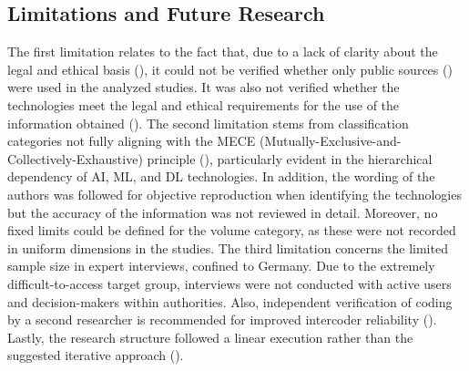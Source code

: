 \documentclass[10pt]{article}
\begin{document}

\subsection{Limitations and Future Research}

The first limitation relates to the fact that, due to a lack of clarity about the legal
and ethical basis (\cite{Ghioni.2023,Wittmer.2022}),
it could not be verified whether only public sources (\cite{NorthAtlanticTreatyOrganization.2002}) were used
in the analyzed studies. It was also not verified whether the technologies meet the
legal and ethical requirements for the use of the information obtained
(\cite{PastorGalindo.2020,Wittmer.2022}). The second
limitation stems from classification categories not fully aligning with the
MECE (Mutually-Exclusive-and-Collectively-Exhaustive) principle (\cite{Lee.2018}),
particularly evident in the hierarchical dependency of AI, ML, and DL technologies. In addition,
the wording of the authors was followed for objective reproduction when identifying the technologies
but the accuracy of the information was not reviewed in detail. Moreover, no fixed limits could be defined
for the volume category, as these were not recorded in uniform dimensions in the studies.
The third limitation concerns the limited sample size in expert interviews, confined to Germany. Due to the
extremely difficult-to-access target group, interviews were not conducted with active users and decision-makers within authorities.
Also, independent verification of coding by a second researcher is recommended for improved intercoder reliability
(\cite{Glaser.2009}). Lastly, the research structure followed a linear execution rather than the suggested iterative approach (\cite{Peffers.2007}).
\end{document}
